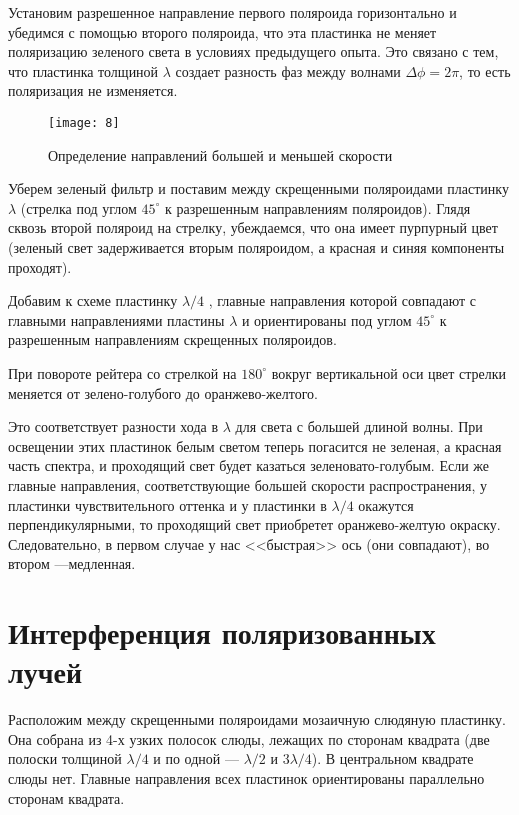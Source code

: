 \documentclass[a4paper, 12pt]{article}
\begin{document}
Установим разрешенное направление первого поляроида горизонтально и
убедимся с помощью второго поляроида, что эта пластинка не меняет
поляризацию зеленого света в условиях предыдущего опыта. Это связано с
тем, что пластинка толщиной $\lambda$ создает разность фаз между
волнами $\Delta \phi = 2\pi$, то есть поляризация не изменяется.

\begin{wrapfigure}{r}{0.4\linewidth}
    \vspace{-10pt}
    \texttt{[image: 8]}
    \caption{Определение направлений большей и меньшей скорости}
    \label{fig:9}
\end{wrapfigure}

Уберем зеленый фильтр и поставим между скрещенными поляроидами
пластинку $\lambda$ (стрелка под углом $45^\circ$ к разрешенным
направлениям поляроидов). Глядя сквозь второй поляроид на стрелку,
убеждаемся, что она имеет пурпурный цвет (зеленый свет задерживается
вторым поляроидом, а красная и синяя компоненты проходят). 

Добавим к схеме пластинку $\lambda/4$ , главные
направления которой совпадают с главными направлениями пластины
$\lambda$ и ориентированы под углом $45^\circ$ к разрешенным
направлениям скрещенных поляроидов.

При повороте рейтера со стрелкой на $180^\circ$ вокруг вертикальной
оси цвет стрелки меняется от зелено-голубого до оранжево-желтого.

Это соответствует разности хода в $\lambda$ для света с
большей длиной волны. При освещении этих пластинок белым светом теперь
погасится не зеленая, а красная часть спектра, и проходящий свет будет
казаться зеленовато-голубым. Если же главные направления,
соответствующие большей скорости распространения, у пластинки
чувствительного оттенка и у пластинки в $\lambda/4$ окажутся
перпендикулярными, то проходящий свет приобретет оранжево-желтую
окраску. Следовательно, в первом случае у нас <<быстрая>> ось (они
совпадают), во втором ---медленная.

\section*{Интерференция поляризованных лучей}
Расположим между скрещенными поляроидами мозаичную слюдяную пластинку.
Она собрана из 4-х узких полосок слюды, лежащих по сторонам квадрата
(две полоски толщиной $\lambda/4$ и по одной --- $\lambda/2$ и
$3\lambda/4$). В центральном квадрате слюды нет. Главные направления
всех пластинок ориентированы параллельно сторонам квадрата.
\end{document}
